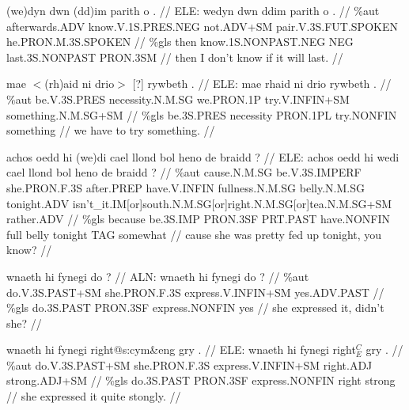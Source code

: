\documentclass[a4paper,10pt]{article}
\begin{document}
\ex
\begingl[lingstyle=gergl]
\glchat (we)dyn dwn (dd)im parith o . //
\glsurface ELE:  wedyn dwn ddim parith o .  //
\glauto \%aut  afterwards{\scriptsize .ADV} know{\scriptsize .V.1S.PRES.NEG} not{\scriptsize .ADV+SM} pair{\scriptsize .V.3S.FUT.SPOKEN} he{\scriptsize .PRON.M.3S.SPOKEN}   //
\glmanual \%gls  then know{\scriptsize .1S.NONPAST.NEG} NEG last{\scriptsize .3S.NONPAST} PRON{\scriptsize .3SM}   //
\gleng then I don't know if it will last. //
\endgl
\xe

\ex
\begingl[lingstyle=gergl]
\glchat mae $<$(rh)aid ni drio$>$ [?] rywbeth . //
\glsurface ELE:  mae rhaid ni drio rywbeth .  //
\glauto \%aut  be{\scriptsize .V.3S.PRES} necessity{\scriptsize .N.M.SG} we{\scriptsize .PRON.1P} try{\scriptsize .V.INFIN+SM} something{\scriptsize .N.M.SG+SM}   //
\glmanual \%gls  be{\scriptsize .3S.PRES} necessity PRON{\scriptsize .1PL} try{\scriptsize .NONFIN} something   //
\gleng we have to try something. //
\endgl
\xe

\ex
\begingl[lingstyle=gergl]
\glchat achos oedd hi (we)di cael llond bol heno de braidd ? //
\glsurface ELE:  achos oedd hi wedi cael llond bol heno de braidd ?  //
\glauto \%aut  cause{\scriptsize .N.M.SG} be{\scriptsize .V.3S.IMPERF} she{\scriptsize .PRON.F.3S} after{\scriptsize .PREP} have{\scriptsize .V.INFIN} fullness{\scriptsize .N.M.SG} belly{\scriptsize .N.M.SG} tonight{\scriptsize .ADV} isn't\_it{\scriptsize .IM[or]south.N.M.SG[or]right.N.M.SG[or]tea.N.M.SG+SM} rather{\scriptsize .ADV}   //
\glmanual \%gls  because be{\scriptsize .3S.IMP} PRON{\scriptsize .3SF} PRT{\scriptsize .PAST} have{\scriptsize .NONFIN} full belly tonight TAG somewhat   //
\gleng cause she was pretty fed up tonight, you know? //
\endgl
\xe

\ex
\begingl[lingstyle=gergl]
\glchat wnaeth hi fynegi do ? //
\glsurface ALN:  wnaeth hi fynegi do ?  //
\glauto \%aut  do{\scriptsize .V.3S.PAST+SM} she{\scriptsize .PRON.F.3S} express{\scriptsize .V.INFIN+SM} yes{\scriptsize .ADV.PAST}   //
\glmanual \%gls  do{\scriptsize .3S.PAST} PRON{\scriptsize .3SF} express{\scriptsize .NONFIN} yes   //
\gleng she expressed it, didn't she? //
\endgl
\xe

\ex
\begingl[lingstyle=gergl]
\glchat wnaeth hi fynegi right@s:cym\&eng gry . //
\glsurface ELE:  wnaeth hi fynegi right$^{C}_{E}$ gry .  //
\glauto \%aut  do{\scriptsize .V.3S.PAST+SM} she{\scriptsize .PRON.F.3S} express{\scriptsize .V.INFIN+SM} right{\scriptsize .ADJ} strong{\scriptsize .ADJ+SM}   //
\glmanual \%gls  do{\scriptsize .3S.PAST} PRON{\scriptsize .3SF} express{\scriptsize .NONFIN} right strong   //
\gleng she expressed it quite stongly. //
\endgl
\xe
\end{document}
